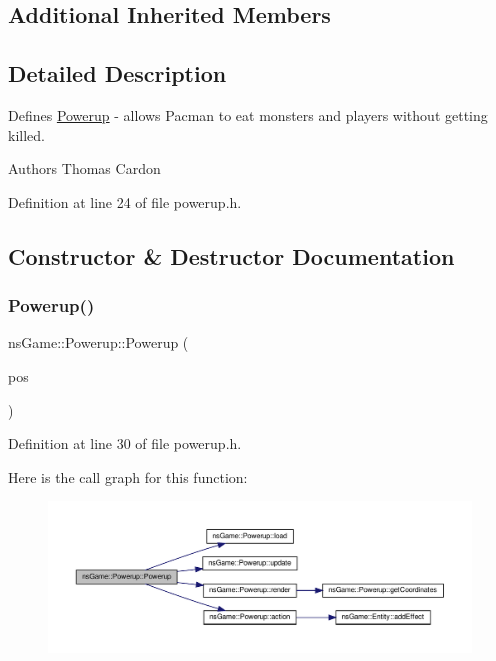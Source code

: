 \subsection*{Additional Inherited Members}


\subsection{Detailed Description}
Defines \hyperlink{classns_game_1_1_powerup}{Powerup} -\/ allows Pacman to eat monsters and players without getting killed. 

\begin{DoxyAuthor}{Authors}
Thomas Cardon 
\end{DoxyAuthor}


Definition at line 24 of file powerup.\+h.



\subsection{Constructor \& Destructor Documentation}
\mbox{\label{classns_game_1_1_powerup_a63e512471f199b9a4830785398f09378}} 
\subsubsection{\texorpdfstring{Powerup()}{Powerup()}}
{\footnotesize\ttfamily ns\+Game\+::\+Powerup\+::\+Powerup (\begin{DoxyParamCaption}\item[{ns\+Graphics\+::\+Vec2D}]{pos }\end{DoxyParamCaption})\hspace{0.3cm}{\ttfamily [inline]}}



Definition at line 30 of file powerup.\+h.

Here is the call graph for this function\+:\nopagebreak
\begin{figure}[H]
\begin{center}
\leavevmode
\includegraphics[width=350pt]{classns_game_1_1_powerup_a63e512471f199b9a4830785398f09378_cgraph}
\end{center}
\end{figure}


